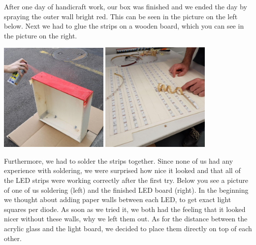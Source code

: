 \documentclass[a4paper,12pt]{article}
\begin{document}
After one day of handicraft work, our box was finished and we ended the day by spraying the outer wall bright red. This can be seen in the picture on the left below.
 Next we had to glue the strips on a wooden board, which you can see in the picture on the right.
 
 \vspace{1cm}

{ \centering
  \includegraphics[width = 0.4\textwidth]{sprayen.jpg}
  \space{   }
  \includegraphics[width = 0.4\textwidth]{kleben.jpg}
  \\}
 \vspace{1cm}
 
Furthermore, we had to solder the strips together.
 Since none of us had any experience with soldering, we were surprised how nice it looked and that all of the LED strips were working correctly after the first try.
 Below you see a picture of one of us soldering (left) and the finished LED board (right).
 In the beginning we thought about adding paper walls between each LED, to get exact light squares per diode.
 As soon as we tried it, we both had the feeling that it looked nicer without these walls, why we left them out.
 As for the distance between the acrylic glass and the light board, we decided to place them directly on top of each other.
 
 \vspace{1cm}
\end{document}

